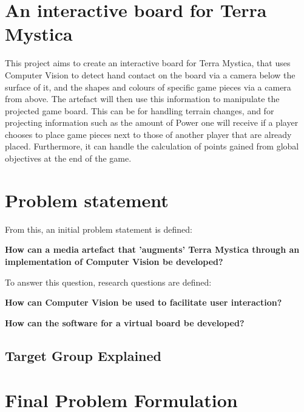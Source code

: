\section{An interactive board for Terra Mystica}
This project aims to create an interactive board for Terra Mystica, that uses Computer Vision to detect hand contact on the board via a camera below the surface of it, and the shapes and colours of specific game pieces via a camera from above. The artefact will then use this information to manipulate the projected game board. This can be for handling terrain changes, and for projecting information such as the amount of Power one will receive if a player chooses to place game pieces next to those of another player that are already placed. Furthermore, it can handle the calculation of points gained from global objectives at the end of the game.

\section{Problem statement}
From this, an initial problem statement is defined: 

\textbf{How can a media artefact that 'augments' Terra Mystica through an implementation of Computer Vision be developed?}

To answer this question, research questions are defined:

\textbf{How can Computer Vision be used to facilitate user interaction?}

\textbf{How can the software for a virtual board be developed?}

\subsection{Target Group Explained}

\section{Final Problem Formulation}\label{sec:finalprob}

